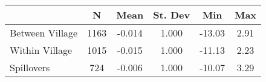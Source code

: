 \begin{tabular}{l*{5}{c}}\hline&\multicolumn{1}{c}{N}&\multicolumn{1}{c}{Mean}&\multicolumn{1}{c}{St. Dev}&\multicolumn{1}{c}{Min}&\multicolumn{1}{c}{Max}\\ \hline 
Between Village & 1163 & -0.014 & 1.000 & -13.03 & 2.91 \\
Within Village & 1015 & -0.015 & 1.000 & -11.13 & 2.23 \\
Spillovers & 724 & -0.006 & 1.000 & -10.07 & 3.29 \\
\hline \end{tabular}
